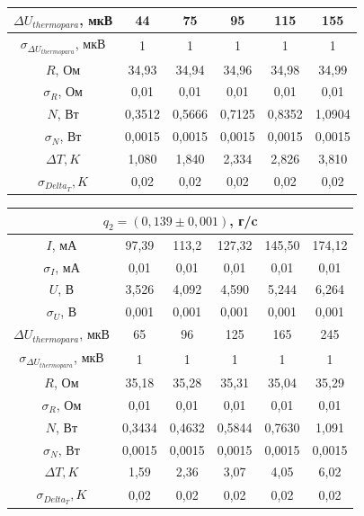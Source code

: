 \documentclass[a4paper, 12pt]{article}%
\begin{document}
\begin{enumerate}
\begin{center}
\begin{tabular}{|c|c|c|c|c|c|}
$\Delta U_{thermopara}$, мкВ & 44 & 75 & 95 & 115 & 155 \\ \hline
$\sigma_{\Delta U_{thermopara}}$, мкВ & 1 & 1 & 1 & 1 & 1 \\ \hline
$R$, Ом & 34,93 & 34,94 & 34,96 & 34,98 & 34,99 \\ \hline
$\sigma_R$, Ом & 0,01 & 0,01 & 0,01 & 0,01 & 0,01 \\ \hline
$N$, Вт & 0,3512 & 0,5666 & 0,7125 &  0,8352 & 1,0904 \\ \hline
$\sigma_N$, Вт & 0,0015 & 0,0015 & 0,0015 & 0,0015 & 0,0015 \\ \hline
$\Delta T, K$ & 1,080 & 1,840 & 2,334 & 2,826 & 3,810 \\ \hline
$\sigma_{Delta_T}, K$ & 0,02 & 0,02 & 0,02 & 0,02 & 0,02 \\ \hline
\end{tabular}

\begin{tabular}{|c|c|c|c|c|c|}
\hline
\multicolumn{6}{|c|}{$q_2 = (0,139 \pm0,001)$, г/c} \\ \hline
$I$, мА & 97,39 & 113,2 & 127,32 & 145,50 & 174,12 \\ \hline
$\sigma_I$, мА & 0,01 & 0,01 & 0,01 & 0,01 & 0,01 \\ \hline
$U$, В & 3,526 & 4,092 & 4,590 & 5,244 & 6,264 \\ \hline
$\sigma_U$, В & 0,001 & 0,001 & 0,001 & 0,001 & 0,001 \\ \hline
$\Delta U_{thermopara}$, мкВ & 65 & 96 & 125 & 165 & 245 \\ \hline
$\sigma_{\Delta U_{thermopara}}$, мкВ & 1 & 1 & 1 & 1 & 1 \\ \hline
$R$, Ом & 35,18 & 35,28 & 35,31 & 35,04 & 35,29 \\ \hline
$\sigma_R$, Ом & 0,01 & 0,01 & 0,01 & 0,01 & 0,01 \\ \hline
$N$, Вт & 0,3434 & 0,4632 & 0,5844 & 0,7630 & 1,091 \\ \hline
$\sigma_N$, Вт & 0,0015 & 0,0015 & 0,0015 & 0,0015 & 0,0015 \\ \hline
$\Delta T, K$ & 1,59 & 2,36 & 3,07 & 4,05 & 6,02 \\ \hline
$\sigma_{Delta_T}, K$ & 0,02 & 0,02 & 0,02 & 0,02 & 0,02 \\ \hline
\end{tabular}


\end{center}
\end{enumerate}
\end{document}
